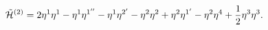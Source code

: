 \begin{equation}
  {\tilde{\cal{H}}^{(2)}}= 2\eta^{1} \eta^{1} - \eta^{1} \eta^{1''} -
  \eta^{1}
  \eta^{2'} - \eta^{2} \eta^{2} + \eta^{2} \eta^{1'} - \eta^{2} \eta^{4} +
  \frac{1}{2}\eta^{3} \eta^{3}.
  \label{a68}
  \end{equation}

